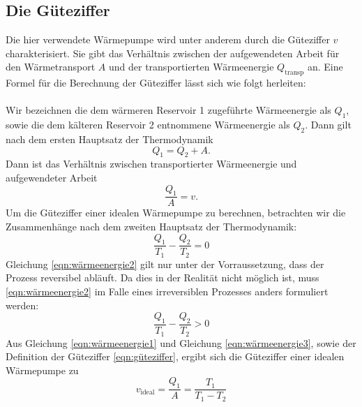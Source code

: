 \documentclass{scrartcl} %
\begin{document}
  \subsection{Die Güteziffer}
  \label{sec:güteziffer}
  Die hier verwendete Wärmepumpe wird unter anderem durch die Güteziffer $ v $ charakterisiert. Sie gibt das Verhältnis zwischen der aufgewendeten Arbeit für den Wärmetransport
  $ A $ und der transportierten Wärmeenergie $ Q_\text{transp} $ an. Eine Formel für die Berechnung der Güteziffer lässt sich wie folgt herleiten: \\
  \\
  Wir bezeichnen die dem wärmeren Reservoir 1 zugeführte Wärmeenergie als $ Q_\text{1} $, sowie die dem kälteren Reservoir 2 entnommene Wärmeenergie als $ Q_\text{2} $.
  Dann gilt nach dem ersten Hauptsatz der Thermodynamik
  \begin{equation}
    Q_\text{1} = Q_\text{2} + A.
    \label{eqn:wärmeenergie1}
  \end{equation}
  Dann ist das Verhältnis zwischen transportierter Wärmeenergie und aufgewendeter Arbeit
  \begin{equation}
    \frac{Q_\text{1}}{A} = v.
    \label{eqn:güteziffer}
  \end{equation}
  Um die Güteziffer einer idealen Wärmepumpe zu berechnen, betrachten wir die Zusammenhänge nach dem zweiten Hauptsatz der Thermodynamik:
  \begin{equation}
    \frac{Q_\text{1}}{T_\text{1}} - \frac{Q_\text{2}}{T_\text{2}} = 0
    \label{eqn:wärmeenergie2}
  \end{equation}
  Gleichung \eqref{eqn:wärmeenergie2} gilt nur unter der Vorraussetzung, dass der Prozess reversibel abläuft.
  Da dies in der Realität nicht möglich ist, muss \eqref{eqn:wärmeenergie2} im Falle eines irreversiblen Prozesses
  anders formuliert werden:
  \begin{equation}
  	\frac{Q_\text{1}}{T_\text{1}} - \frac{Q_\text{2}}{T_\text{2}} > 0
  	\label{eqn:wärmeenergie3}
  \end{equation}
	Aus Gleichung \eqref{eqn:wärmeenergie1} und Gleichung \eqref{eqn:wärmeenergie3}, sowie der Definition der Güteziffer
	\eqref{eqn:güteziffer}, ergibt sich die Güteziffer einer idealen Wärmepumpe zu
	\begin{equation}
		v_\text{ideal} = \frac{Q_\text{1}}{A} = \frac{T_\text{1}}{T_\text{1} - T_\text{2}}
		\label{eqn:idealegüteziffer}
	\end{equation}
\end{document}
